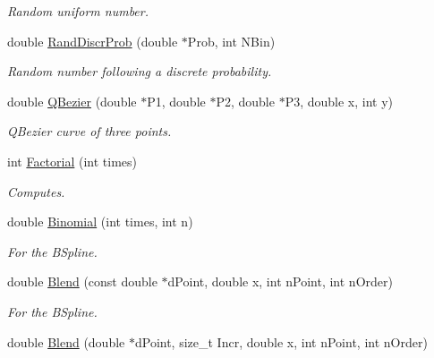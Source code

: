 \begin{DoxyCompactItemize}
\begin{DoxyCompactList}\small\item\em Random uniform number. \end{DoxyCompactList}\item 
double \hyperlink{classMatematica_ad3a801671ce900a848167e341ee1a64f}{Rand\+Discr\+Prob} (double $\ast$Prob, int N\+Bin)\hypertarget{classMatematica_ad3a801671ce900a848167e341ee1a64f}{}\label{classMatematica_ad3a801671ce900a848167e341ee1a64f}

\begin{DoxyCompactList}\small\item\em Random number following a discrete probability. \end{DoxyCompactList}\item 
double \hyperlink{classMatematica_a2cd9afb9e7613f99ea679738094c5c82}{Q\+Bezier} (double $\ast$P1, double $\ast$P2, double $\ast$P3, double x, int y)\hypertarget{classMatematica_a2cd9afb9e7613f99ea679738094c5c82}{}\label{classMatematica_a2cd9afb9e7613f99ea679738094c5c82}

\begin{DoxyCompactList}\small\item\em Q\+Bezier curve of three points. \end{DoxyCompactList}\item 
int \hyperlink{classMatematica_ad2b38169a207719ef452a9c7f5bd7dc1}{Factorial} (int times)
\begin{DoxyCompactList}\small\item\em Computes. \end{DoxyCompactList}\item 
double \hyperlink{classMatematica_a4824376b80f3c23bd55989b1a6f80ffc}{Binomial} (int times, int n)\hypertarget{classMatematica_a4824376b80f3c23bd55989b1a6f80ffc}{}\label{classMatematica_a4824376b80f3c23bd55989b1a6f80ffc}

\begin{DoxyCompactList}\small\item\em For the B\+Spline. \end{DoxyCompactList}\item 
double \hyperlink{classMatematica_a9dbb46c7af9cbcd87568e0dace30d10e}{Blend} (const double $\ast$d\+Point, double x, int n\+Point, int n\+Order)\hypertarget{classMatematica_a9dbb46c7af9cbcd87568e0dace30d10e}{}\label{classMatematica_a9dbb46c7af9cbcd87568e0dace30d10e}

\begin{DoxyCompactList}\small\item\em For the B\+Spline. \end{DoxyCompactList}\item 
double \hyperlink{classMatematica_a078a6c2222921c85f87f62b4d61b4553}{Blend} (double $\ast$d\+Point, size\+\_\+t Incr, double x, int n\+Point, int n\+Order)\hypertarget{classMatematica_a078a6c2222921c85f87f62b4d61b4553}{}\label{classMatematica_a078a6c2222921c85f87f62b4d61b4553}


\end{DoxyCompactItemize}
